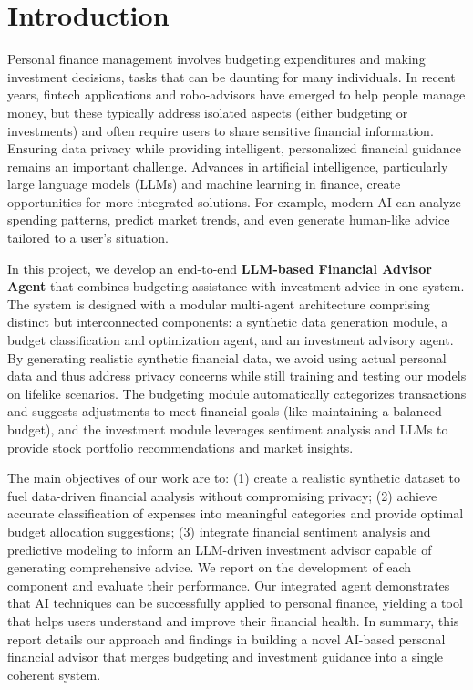 \documentclass{scrartcl}
\begin{document}
\listoftables

\newpage

\section{Introduction}
Personal finance management involves budgeting expenditures and making investment decisions, tasks that can be daunting for many individuals. In recent years, fintech applications and robo-advisors have emerged to help people manage money, but these typically address isolated aspects (either budgeting or investments) and often require users to share sensitive financial information. Ensuring data privacy while providing intelligent, personalized financial guidance remains an important challenge. Advances in artificial intelligence, particularly large language models (LLMs) and machine learning in finance, create opportunities for more integrated solutions. For example, modern AI can analyze spending patterns, predict market trends, and even generate human-like advice tailored to a user's situation.

In this project, we develop an end-to-end \textbf{LLM-based Financial Advisor Agent} that combines budgeting assistance with investment advice in one system. The system is designed with a modular multi-agent architecture comprising distinct but interconnected components: a synthetic data generation module, a budget classification and optimization agent, and an investment advisory agent. By generating realistic synthetic financial data, we avoid using actual personal data and thus address privacy concerns while still training and testing our models on lifelike scenarios. The budgeting module automatically categorizes transactions and suggests adjustments to meet financial goals (like maintaining a balanced budget), and the investment module leverages sentiment analysis and LLMs to provide stock portfolio recommendations and market insights.

The main objectives of our work are to: (1) create a realistic synthetic dataset to fuel data-driven financial analysis without compromising privacy; (2) achieve accurate classification of expenses into meaningful categories and provide optimal budget allocation suggestions; (3) integrate financial sentiment analysis and predictive modeling to inform an LLM-driven investment advisor capable of generating comprehensive advice. We report on the development of each component and evaluate their performance. Our integrated agent demonstrates that AI techniques can be successfully applied to personal finance, yielding a tool that helps users understand and improve their financial health. In summary, this report details our approach and findings in building a novel AI-based personal financial advisor that merges budgeting and investment guidance into a single coherent system.
\end{document}

